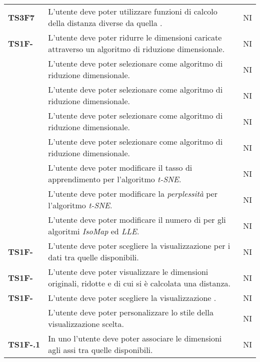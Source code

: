 {\begin{longtable}{ C{2cm} | C{12cm}| C{1.5cm} }
\textbf{TS3F7} & 
L'utente deve poter utilizzare funzioni di calcolo della distanza diverse da quella . & 
NI\\	

\textbf{TS1F-} & 
L'utente deve poter ridurre le dimensioni caricate attraverso un algoritmo di riduzione dimensionale. & 
NI\\

\textbf{} & 
L'utente deve poter selezionare \textit{} come algoritmo di riduzione dimensionale. & 
NI\\

\textbf{} & 
L'utente deve poter selezionare \textit{} come algoritmo di riduzione dimensionale. & 
NI\\

\textbf{} & 
L'utente deve poter selezionare \textit{} come algoritmo di riduzione dimensionale. & 
NI\\

\textbf{} & 
L'utente deve poter selezionare \textit{} come algoritmo di riduzione dimensionale. & 
NI\\

\textbf{} & 
L'utente deve poter modificare il tasso di apprendimento per l'algoritmo \textit{t-SNE}. & 
NI\\

\textbf{} & 
L'utente deve poter modificare la \textit{perplessità} per l'algoritmo \textit{t-SNE}. & 
NI\\

\textbf{} & 
L'utente deve poter modificare il numero di \textit{} per gli algoritmi \textit{IsoMap} ed \textit{LLE}. & 
NI\\

\textbf{TS1F-} & 
L'utente deve poter scegliere la visualizzazione per i dati tra quelle disponibili. & 
NI\\

\textbf{TS1F-} & 
L'utente deve poter visualizzare le dimensioni originali, ridotte e di cui si è calcolata una distanza. & 
NI\\

\textbf{TS1F-} & 
L'utente deve poter scegliere la visualizzazione . & 
NI\\

\textbf{} & 
L'utente deve poter personalizzare lo stile della visualizzazione scelta. & 
NI\\

\textbf{TS1F-.1} & 
In uno  l'utente deve poter associare le dimensioni agli assi tra quelle disponibili. & 
NI\\


\end{longtable}}
